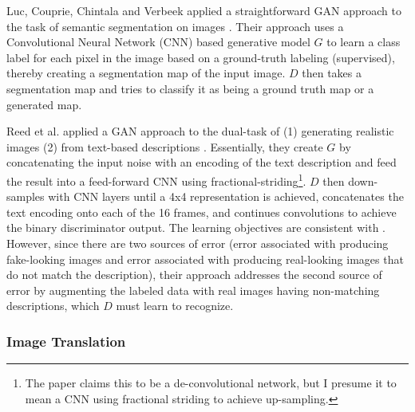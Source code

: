 \documentclass[11pt]{article}
\begin{document}

Luc, Couprie, Chintala and Verbeek applied a straightforward GAN approach to the task of semantic segmentation on images \cite{Luc2016SemanticSU}.  Their approach uses a Convolutional Neural Network (CNN) based generative model $G$ to learn a class label for each pixel in the image based on a ground-truth labeling (supervised), thereby creating a segmentation map of the input image.  $D$ then takes a segmentation map and tries to classify it as being a ground truth map or a generated map.  


Reed et al. applied a GAN approach to the dual-task of (1) generating realistic images (2) from text-based descriptions \cite{reed2016generative}.  Essentially, they create $G$ by concatenating the input noise with an encoding of the text description and feed the result into a feed-forward CNN using fractional-striding\footnote{The paper claims this to be a de-convolutional network, but I presume it to mean a CNN using fractional striding to achieve up-sampling.}.  $D$ then down-samples with CNN layers until a 4x4 representation is achieved, concatenates the text encoding onto each of the 16 frames, and continues convolutions to achieve the binary discriminator output.  The learning objectives are consistent with \cite{NIPS2014_5423}.  However, since there are two sources of error (error associated with producing fake-looking images and error associated with producing real-looking images that do not match the description), their approach addresses the second source of error by augmenting the labeled data with real images having non-matching descriptions, which $D$ must learn to recognize.

\subsubsection{Image Translation}
\end{document}

